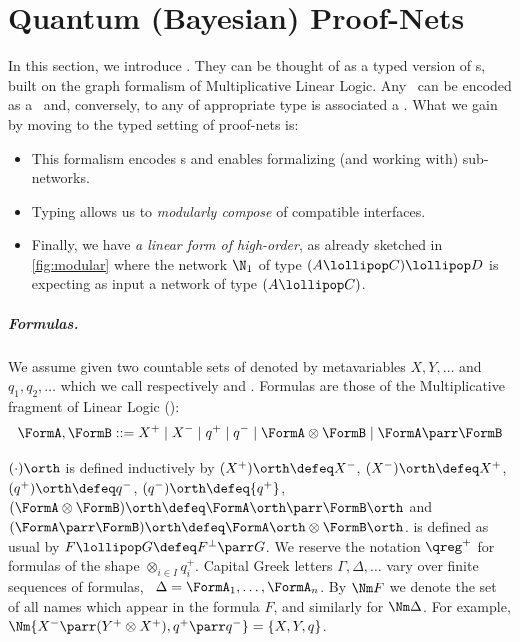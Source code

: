 \section{Quantum (Bayesian) Proof-Nets}
\label{sec:qpns}

In this section, we introduce \qpns.
They can be thought of as a typed version of \QBN s, built on the graph formalism of Multiplicative Linear Logic.
Any \QBN\ can be encoded as a \qpn\ and, conversely, to any \qpn of appropriate type is associated a \QBN.
What we gain by moving to the typed setting of proof-nets is:
\begin{itemize}
\item 
This formalism encodes \qqbn s and enables formalizing (and working with) sub-networks.
\item
Typing allows us to \emph{modularly compose} \qpns of compatible interfaces.
\item
Finally, we have \emph{a linear form of high-order}, as already sketched in \cref{fig:modular} where the network $\N_1$ of type $(A\lollipop C) \lollipop D$ is expecting as input a network of type $(A\lollipop C)$.
\end{itemize}

\subparagraph{Formulas.}

We assume given two countable sets of  denoted by metavariables $X, Y, \dots$ and $q_1, q_2, \dots$ which we call respectively  and .
Formulas are those of the Multiplicative fragment of Linear Logic (\MLL):
\begin{equation*}
	\FormA,\FormB ::=
	X^+	\mid X^- \mid q^+ \mid q^-
	\mid\FormA\otimes\FormB
	\mid\FormA\parr\FormB
\end{equation*}

 $(\cdot)\orth$ is defined inductively by
$(X^+)\orth\defeq X^-$,
$(X^-)\orth\defeq X^+$, 
$(q^+)\orth \defeq q^-$,
$(q^-)\orth \defeq {q^+}$,
$(\FormA\otimes\FormB)\orth \defeq\FormA\orth\parr\FormB\orth$ and
$(\FormA\parr\FormB)\orth \defeq\FormA\orth\otimes\FormB\orth$.
 is defined as usual by $F\lollipop G \defeq F^\bot \parr G$. 
We reserve the notation $\qreg^+$ for formulas of the shape $\otimes_{i\in I} q_i^+$.
Capital Greek letters $\Gamma,\Delta,\dots$ vary over finite sequences of formulas, \ie\ $\Delta = \FormA_1,\dots, \FormA_n$.
By $\Nm F$ we denote the set of all names which appear in the formula $F$, and similarly for $\Nm \Delta$.
For example, $\Nm{X^-\parr (Y^+\otimes X^+), q^+\parr q^-} =\{X,Y,q\}$.

